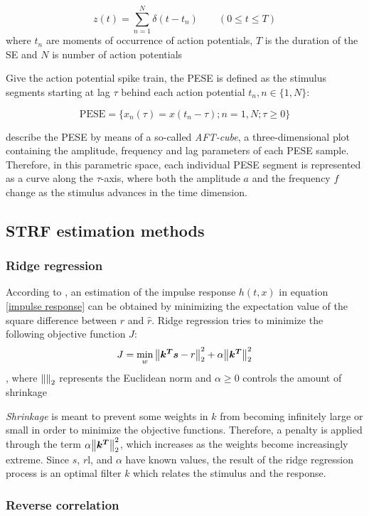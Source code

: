 \begin{equation}
	z(t) = \sum_{n=1}^N \delta(t - t _n) \qquad (0 \leq t \leq T)
\end{equation}
\noindent where $t_n$ are moments of occurrence of action potentials, $T$ is the duration of the SE and $N$ is number of action potentials

Give the action potential spike train, the PESE is defined as the stimulus segments starting at lag $\tau$ behind each action potential $t_n, n \in \{1, N\}$:

\begin{equation}
	\mathrm{PESE} = \{x_n(\tau) = x(t_n - \tau); n = 1, N; \tau \geq 0\}
\end{equation}


\textcite{aertsenSpectrotemporalReceptiveFields1980} describe the PESE by means of a so-called \emph{AFT-cube}, a three-dimensional plot containing the amplitude, frequency and lag parameters of each PESE sample. Therefore, in this parametric space, each individual PESE segment is represented as a curve along the $\tau$-axis, where both the amplitude $a$ and the frequency $f$ change as the stimulus advances in the time dimension.

\subsection{STRF estimation methods}

\subsubsection{Ridge regression}
According to \textcite{theunissenEstimatingSpatiotemporalReceptive2001}, an estimation of the impulse response $h(t, x)$ in equation \eqref{impulse response} can be obtained by minimizing the expectation value of the square difference between $r$ and $\hat{r}$.
Ridge regression tries to minimize the following objective function $J$:
\begin{equation}
	J = \min_w \norm{\bm{k^T}\bm{s} - r}_2^2 + \alpha \norm{\bm{k^T}}_2^2
\end{equation}
, where $\norm{}_2$ represents the Euclidean norm and $\alpha \geq 0$ controls the amount of shrinkage

\emph{Shrinkage} is meant to prevent some weights in $k$ from becoming infinitely large or small in order to minimize the objective functions. Therefore, a penalty is applied through the term $\alpha \norm{\bm{k^T}}_2^2$, which increases as the weights become increasingly extreme. Since $s$, $r$l, and $\alpha$ have known values, the result of the ridge regression process is an optimal filter $k$ which relates the stimulus and the response.

\subsubsection{Reverse correlation}

